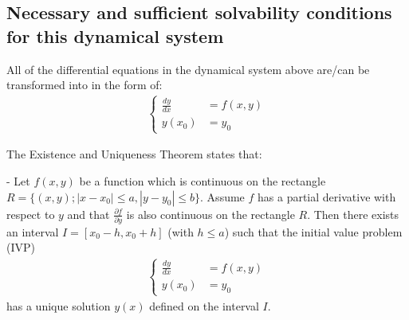 \documentclass[a4paper]{article}
\numberwithin{equation}{section}
\begin{document}
\subsection{Necessary and sufficient solvability conditions for this dynamical system}
All of the differential equations in the dynamical system above are/can be transformed into in the form of:
\begin{align*}
  \begin{cases}
    \frac{dy}{dx} & = f(x,y) \\
    y(x_0)        & = y_0
  \end{cases}
\end{align*}

The Existence and Uniqueness Theorem states that:

- Let \(f(x,y)\) be a function which is continuous on the rectangle  \(R = \{(x, y); |x - x_0| \leq a, |y - y_0| \leq b\} \).
Assume \(f\) has a partial derivative with respect to \(y\) and that \(\frac{\partial f}{\partial y}\) is also continuous on the rectangle \(R\).
Then there exists an interval \(I=[x_0-h, x_0+h]\) (with \(h \leq a\)) such that the initial value problem (IVP)
\begin{align*}
  \begin{cases}
    \frac{dy}{dx} & = f(x,y) \\
    y(x_0)        & = y_0
  \end{cases}
\end{align*}
has a unique solution \(y(x)\) defined on the interval \(I\).
\end{document}
